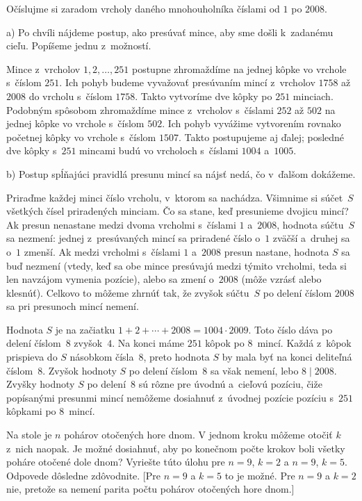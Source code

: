 {%
Očíslujme si zaradom vrcholy daného mnohouholníka číslami od $1$ po $2008$.

\smallskip
a) Po chvíli nájdeme postup, ako presúvať mince, aby sme došli k~zadanému cieľu. Popíšeme jednu z~možností.

Mince z~vrcholov $1, 2, \dots, 251$ postupne zhromaždíme na jednej kôpke vo vrchole s~číslom $251$. Ich pohyb budeme vyvažovať presúvaním mincí z~vrcholov $1758$ až $2008$ do vrcholu s~číslom $1758$. Takto vytvoríme dve kôpky po $251$ minciach. Podobným spôsobom zhromaždíme mince z~vrcholov s~číslami $252$ až $502$ na jednej kôpke vo vrchole s~číslom $502$. Ich pohyb vyvážime vytvorením rovnako početnej kôpky vo vrchole s~číslom $1507$. Takto postupujeme aj ďalej; posledné dve kôpky s~$251$ mincami budú vo vrcholoch s~číslami $1004$ a~$1005$.

\smallskip
b) Postup spĺňajúci pravidlá presunu mincí sa nájsť nedá, čo v~ďalšom dokážeme.

Priraďme každej minci číslo vrcholu, v~ktorom sa nachádza. Všimnime si súčet~$S$ všetkých čísel priradených minciam. Čo sa stane, keď presunieme dvojicu mincí? Ak presun nenastane medzi dvoma vrcholmi s~číslami $1$ a~$2008$, hodnota súčtu~$S$ sa nezmení: jednej z~presúvaných mincí sa priradené číslo o~$1$ zväčší a~druhej sa o~$1$ zmenší. Ak medzi vrcholmi s~číslami $1$ a~$2008$ presun nastane, hodnota $S$ sa buď nezmení (vtedy, keď sa obe mince presúvajú medzi týmito vrcholmi, teda si len navzájom vymenia pozície), alebo sa zmení o~$2008$ (môže vzrásť alebo klesnúť). Celkovo to môžeme zhrnúť tak, že zvyšok súčtu~$S$ po delení číslom $2008$ sa pri presunoch mincí nemení.

Hodnota $S$ je na začiatku $1+2+\cdots+2008=1004\cdot 2009$. Toto číslo dáva po delení číslom~$8$ zvyšok~$4$. Na konci máme $251$ kôpok po $8$~mincí. Každá z~kôpok prispieva do $S$ násobkom čísla~$8$, preto hodnota $S$ by mala byť na konci deliteľná číslom~$8$. Zvyšok hodnoty $S$ po delení číslom~$8$ sa však nemení, lebo $8\mid 2008$. Zvyšky hodnoty $S$ po delení~$8$ sú rôzne pre úvodnú a~cieľovú pozíciu, čiže popísanými presunmi mincí nemôžeme dosiahnuť z~úvodnej pozície pozíciu s~$251$ kôpkami po $8$~mincí.

Na stole je $n$ pohárov otočených hore dnom. V jednom kroku môžeme otočiť $k$ z~nich naopak. Je možné dosiahnuť, aby po konečnom počte krokov boli všetky poháre otočené dole dnom? Vyriešte túto úlohu pre $n=9$, $k=2$ a $n=9$, $k=5$. Odpovede dôsledne zdôvodnite. [Pre $n=9$ a $k=5$ to je možné. Pre $n=9$ a $k=2$ nie, pretože sa nemení parita počtu pohárov otočených hore dnom.]

}
